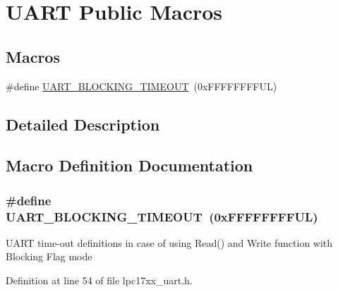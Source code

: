 \hypertarget{group___u_a_r_t___public___macros}{}\section{U\+A\+RT Public Macros}
\label{group___u_a_r_t___public___macros}
\subsection*{Macros}
\begin{DoxyCompactItemize}
\item 
\#define \hyperlink{group___u_a_r_t___public___macros_ga98a009d55ad0d99b3f84391f0552faeb}{U\+A\+R\+T\+\_\+\+B\+L\+O\+C\+K\+I\+N\+G\+\_\+\+T\+I\+M\+E\+O\+UT}~(0x\+F\+F\+F\+F\+F\+F\+F\+F\+U\+L)
\end{DoxyCompactItemize}


\subsection{Detailed Description}


\subsection{Macro Definition Documentation}
\subsubsection[{\texorpdfstring{U\+A\+R\+T\+\_\+\+B\+L\+O\+C\+K\+I\+N\+G\+\_\+\+T\+I\+M\+E\+O\+UT}{UART_BLOCKING_TIMEOUT}}]{\setlength{\rightskip}{0pt plus 5cm}\#define U\+A\+R\+T\+\_\+\+B\+L\+O\+C\+K\+I\+N\+G\+\_\+\+T\+I\+M\+E\+O\+UT~(0x\+F\+F\+F\+F\+F\+F\+F\+F\+U\+L)}\hypertarget{group___u_a_r_t___public___macros_ga98a009d55ad0d99b3f84391f0552faeb}{}\label{group___u_a_r_t___public___macros_ga98a009d55ad0d99b3f84391f0552faeb}
U\+A\+RT time-\/out definitions in case of using Read() and Write function with Blocking Flag mode 

Definition at line 54 of file lpc17xx\+\_\+uart.\+h.

